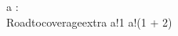 \begin{circus}
\circchannel a : \nat \\
\circprocess Roadtocoverageextra \circdef \circbegin
	\circspot a!1 \then a!(1 + 2) \then \Skip \\
	\circend
\end{circus}
